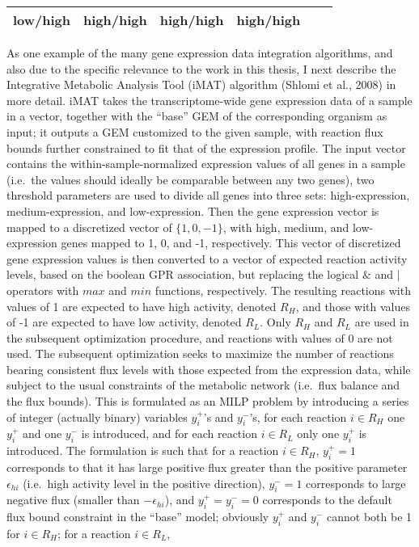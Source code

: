 \documentclass[12pt,twoside,openany,\mydriver]{thesis}  %
\begin{document}
\begin{longtable}[]{@{}cccccc@{}}
\begin{minipage}[t]{0.18\columnwidth}
low/high\strut
\end{minipage} & \begin{minipage}[t]{0.13\columnwidth}\centering
high/high\strut
\end{minipage} & \begin{minipage}[t]{0.19\columnwidth}\centering
high/high\strut
\end{minipage} & \begin{minipage}[t]{0.11\columnwidth}\centering
high/high\strut
\end{minipage}\tabularnewline
\bottomrule
\end{longtable}
As one example of the many gene expression data integration algorithms, and also due to the specific relevance to the work in this thesis, I next describe the Integrative Metabolic Analysis Tool (iMAT) algorithm (Shlomi et al., 2008) in more detail. iMAT takes the transcriptome-wide gene expression data of a sample in a vector, together with the ``base'' GEM of the corresponding organism as input; it outputs a GEM customized to the given sample, with reaction flux bounds further constrained to fit that of the expression profile. The input vector contains the within-sample-normalized expression values of all genes in a sample (i.e.~the values should ideally be comparable between any two genes), two threshold parameters are used to divide all genes into three sets: high-expression, medium-expression, and low-expression. Then the gene expression vector is mapped to a discretized vector of \(\{1,0,-1\}\), with high, medium, and low-expression genes mapped to 1, 0, and -1, respectively. This vector of discretized gene expression values is then converted to a vector of expected reaction activity levels, based on the boolean GPR association, but replacing the logical \(\&\) and \(|\) operators with \(max\) and \(min\) functions, respectively. The resulting reactions with values of 1 are expected to have high activity, denoted \(R_H\), and those with values of -1 are expected to have low activity, denoted \(R_L\). Only \(R_H\) and \(R_L\) are used in the subsequent optimization procedure, and reactions with values of 0 are not used. The subsequent optimization seeks to maximize the number of reactions bearing consistent flux levels with those expected from the expression data, while subject to the usual constraints of the metabolic network (i.e.~flux balance and the flux bounds). This is formulated as an MILP problem by introducing a series of integer (actually binary) variables \(y^+_i\)'s and \(y^-_i\)'s, for each reaction \(i\in R_H\) one \(y^+_i\) and one \(y^-_i\) is introduced, and for each reaction \(i\in R_L\) only one \(y^+_i\) is introduced. The formulation is such that for a reaction \(i\in R_H\), \(y^+_i=1\) corresponds to that it has large positive flux greater than the positive parameter \(\epsilon_{hi}\) (i.e.~high activity level in the positive direction), \(y^-_i=1\) corresponds to large negative flux (smaller than \(-\epsilon_{hi}\)), and \(y^+_i=y^-_i=0\) corresponds to the default flux bound constraint in the ``base'' model; obviously \(y^+_i\) and \(y^-_i\) cannot both be 1 for \(i\in R_H\); for a reaction \(i\in R_L\), 
\end{document}
